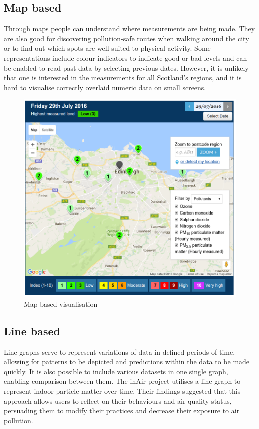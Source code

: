 \subsection{Map based}
Through maps people can understand where measurements are being made. They are also good for discovering pollution-safe routes when walking around the city or to find out which spots are well suited to physical activity.  Some representations include colour indicators to indicate good or bad levels and can be enabled to read past data by selecting previous dates. However, it is unlikely that one is interested in the measurements for all Scotland's regions, and it is hard to visualise correctly overlaid numeric data on small screens.

\begin{figure}[H]
\begin{adjustbox}{width=1\textwidth,center=\textwidth}
  \centering
  \includegraphics[scale=.30]{images/map_visualization.png}
\end{adjustbox}
  \caption[Map-based visualisation]{Map-based visualisation \cite{Scottishairquality.co.uk2016}}
  \label{fig:web_based_desktop_visualization}
\end{figure}


\subsection{Line based}
Line graphs serve to represent variations of data in defined periods of time, allowing for patterns to be depicted and predictions within the data to be made quickly. It is also possible to include various datasets in one single graph, enabling comparison between them. The inAir project \cite{Kim2013} utilises a line graph to represent indoor particle matter over time. Their findings suggested that this approach allows users to reflect on their behaviours and air quality status, persuading them to modify their practices and decrease their exposure to air pollution. 

